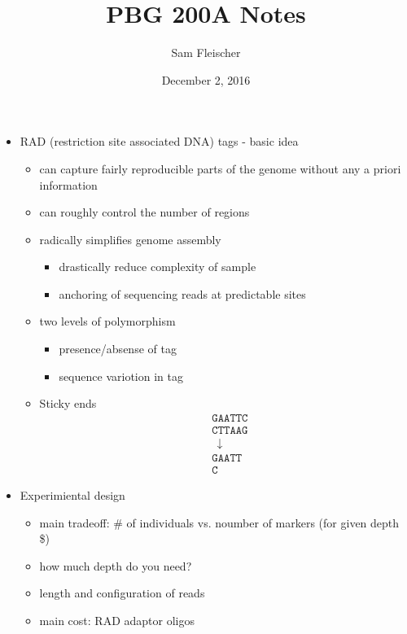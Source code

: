 \documentclass{article}
\title{PBG 200A Notes}
\author{Sam Fleischer}
\date{December 2, 2016}
\begin{document}
    \maketitle

    \begin{itemize}
        \item RAD (restriction site associated DNA) tags - basic idea
        \begin{itemize}
            \item can capture fairly reproducible parts of the genome without any a priori information
            \item can roughly control the number of regions
            \item radically simplifies genome assembly
            \begin{itemize}
                \item drastically reduce complexity of sample
                \item anchoring of sequencing reads at predictable sites
            \end{itemize}
            \item two levels of polymorphism
            \begin{itemize}
                \item presence/absense of tag
                \item sequence variotion in tag
            \end{itemize}
            \item Sticky ends
            \begin{align*}
                &\texttt{GAATTC}\\
                &\texttt{CTTAAG}\\
                &\ \ \downarrow\\
                &\texttt{GAATT} \\
                &\texttt{C}
            \end{align*}
        \end{itemize}
        \item Experimiental design
        \begin{itemize}
            \item main tradeoff: \# of individuals vs. noumber of markers (for given depth \$)
            \item how much depth do you need?
            \item length and configuration of reads
            \item main cost: RAD adaptor oligos

\end{itemize}
\end{itemize}
\end{document}
